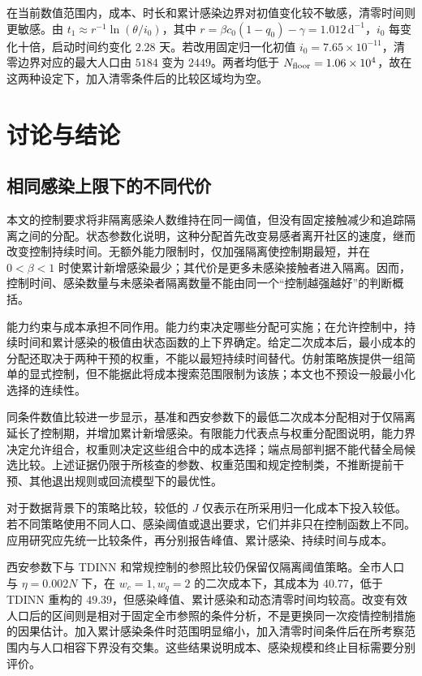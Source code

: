 \documentclass[lang=cn,a4paper,newtx]{elegantpaper}
\numberwithin{equation}{section}
\theoremstyle{plain}
\begin{document}
在当前数值范围内，成本、时长和累计感染边界对初值变化较不敏感，清零时间则更敏感。由 $t_1\approx r^{-1}\ln(\theta/i_0)$，其中 $r=\beta c_0(1-q_0)-\gamma=1.012\,\mathrm{d}^{-1}$，$i_0$ 每变化十倍，启动时间约变化 $2.28$ 天。若改用固定归一化初值 $i_0=7.65\times10^{-11}$，清零边界对应的最大人口由 $5184$ 变为 $2449$。两者均低于 $N_{\rm floor}=1.06\times10^4$，故在这两种设定下，加入清零条件后的比较区域均为空。


\FloatBarrier

\section{讨论与结论}
\label{sec:discussion}
\subsection{相同感染上限下的不同代价}
本文的控制要求将非隔离感染人数维持在同一阈值，但没有固定接触减少和追踪隔离之间的分配。状态参数化说明，这种分配首先改变易感者离开社区的速度，继而改变控制持续时间。无额外能力限制时，仅加强隔离使控制期最短，并在 $0<\beta<1$ 时使累计新增感染最少；其代价是更多未感染接触者进入隔离。因而，控制时间、感染数量与未感染者隔离数量不能由同一个“控制越强越好”的判断概括。

能力约束与成本承担不同作用。能力约束决定哪些分配可实施；在允许控制中，持续时间和累计感染的极值由状态函数的上下界确定。给定二次成本后，最小成本的分配还取决于两种干预的权重，不能以最短持续时间替代。仿射策略族提供一组简单的显式控制，但不能据此将成本搜索范围限制为该族；本文也不预设一般最小化选择的连续性。

同条件数值比较进一步显示，基准和西安参数下的最低二次成本分配相对于仅隔离延长了控制期，并增加累计新增感染。有限能力代表点与权重分配图说明，能力界决定允许组合，权重则决定这些组合中的成本选择；端点局部判据不能代替全局候选比较。上述证据仍限于所核查的参数、权重范围和规定控制类，不推断提前干预、其他退出规则或回流模型下的最优性。

对于数据背景下的策略比较，较低的 $J$ 仅表示在所采用归一化成本下投入较低。若不同策略使用不同人口、感染阈值或退出要求，它们并非只在控制函数上不同。应用研究应先统一比较条件，再分别报告峰值、累计感染、持续时间与成本。

西安参数下与 TDINN 和常规控制的参照比较仍保留仅隔离阈值策略。全市人口与 $\eta=0.002N$ 下，在 $w_c=1,w_q=2$ 的二次成本下，其成本为 $40.77$，低于 TDINN 重构的 $49.39$，但感染峰值、累计感染和动态清零时间均较高。改变有效人口后的区间则是相对于固定全市参照的条件分析，不是更换同一次疫情控制措施的因果估计。加入累计感染条件时范围明显缩小，加入清零时间条件后在所考察范围内与人口相容下界没有交集。这些结果说明成本、感染规模和终止目标需要分别评价。
\end{document}
